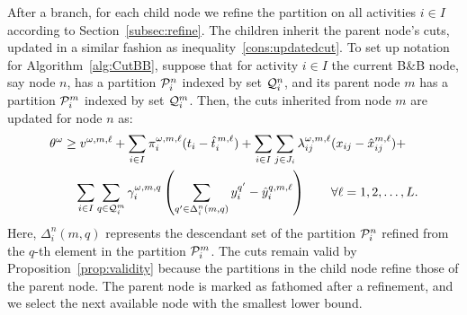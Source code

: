 \documentclass[11pt]{article}
\newcommand{\cQ}{{\cal Q}}
\newcommand{\cP}{{\cal P}}
\begin{document}
	After a branch, for each child node we refine the partition on all activities \(i \in I\) according to Section~\ref{subsec:refine}.
	The children inherit the parent node's cuts, updated in a similar fashion as inequality~\eqref{cons:updatedcut}. To set up notation for Algorithm~\ref{alg:CutBB}, suppose that for activity \(i \in I\) the current B\&B node, say node \(n\), has a partition \(\cP_i^n\) indexed by set \(\cQ_i^n\), and its parent node \(m\) has a partition \(\cP_i^m\) indexed by set \(\cQ_i^m\). Then, the cuts inherited from node \(m\) are updated for node \(n\) as:
	\begin{align}\label{cons:updatedcutBB}
		& \theta^\omega \geq v^{\omega,m,\ell} + \sum_{i \in I} \pi_i^{\omega,m,\ell} (t_i - \hat{t}_i^{\, m,\ell}) + \sum_{i \in I} \sum_{j \in J_i} \lambda_{ij}^{\omega,m,\ell} (x_{ij} - \hat{x}_{ij}^{m,\ell}) + \nonumber \\
		& \qquad \sum_{i \in I} \sum_{q \in \cQ^{m}_i} \gamma_{i}^{\omega,m,q} \left( \sum_{q^\prime \in \Delta^n_i(m,q)} y_i^{q^\prime} - \hat{y}_i^{q,m,\ell} \right) \qquad \forall \ell = 1,2, \dots, L.
	\end{align}
	Here, \(\Delta^n_i(m,q)\) represents the descendant set of the partition \(\cP_i^n\) refined from the \(q\)-th element in the partition \(\cP_i^m\). The cuts remain valid by Proposition~\ref{prop:validity} because the partitions in the child node refine those of the parent node. The parent node is marked as fathomed after a refinement, and we select the next available node with the smallest lower bound.  
\end{document}
